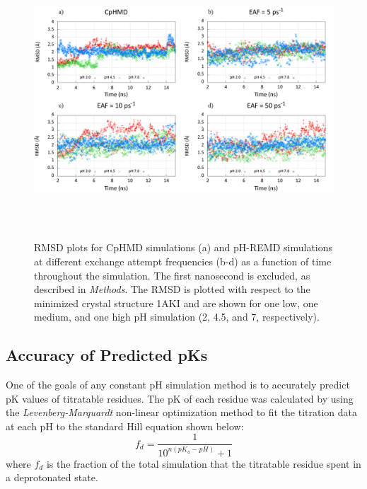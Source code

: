 \begin{figure}
 \includegraphics[width=6.5in, height=4.06in]{1AKI_RMSD_Comparison.png}
 \caption{RMSD plots for CpHMD simulations (a) and pH-REMD simulations at
          different exchange attempt frequencies (b-d) as a function of time
          throughout the simulation. The first nanosecond is excluded, as
          described in \emph{Methods}. The RMSD is plotted with respect to the
          minimized crystal structure 1AKI and are shown for one low, one
          medium, and one high pH simulation (2, 4.5, and 7, respectively).}
 \label{fig3:RMSD}
\end{figure}

\subsection{Accuracy of Predicted pKs}

One of the goals of any constant pH simulation method is to accurately predict
pK values of titratable residues. The pK of each residue was
calculated by using the \emph{Levenberg-Marquardt} non-linear optimization
method to fit the titration data at each pH to the standard Hill equation shown
below:
\begin{equation}
 f_{d} = \frac 1 {10 ^ {n \left( pK_a - pH \right)} + 1}
 \label{eq3:hill}
\end{equation}
where $f_d$ is the fraction of the total simulation that the titratable residue
spent in a deprotonated state.

